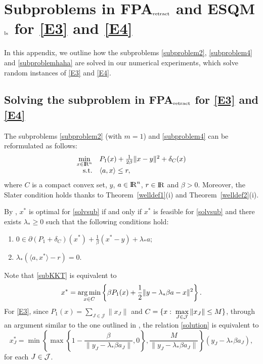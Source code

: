 \documentclass[10pt]{article}
\numberwithin{equation}{section}
\def\R{{\rm I\!R}}
\def\argmin{\mathop{\rm arg\,min}}
\begin{document}
\appendix

\section{Subproblems in FPA$_{\rm retract}$ and ESQM$_{\rm ls}$ for \eqref{E3} and \eqref{E4}}

In this appendix, we outline how the subproblems \eqref{subproblem2}, \eqref{subproblem4} and \eqref{subproblemhaha} are solved in our numerical experiments, which solve random instances of \eqref{E3} and \eqref{E4}.

\subsection{Solving the subproblem in FPA$_{\rm retract}$ for \eqref{E3} and \eqref{E4} }\label{sec:append1}
The subproblems \eqref{subproblem2} (with $m = 1$) and \eqref{subproblem4} can be reformulated as follows:
\begin{equation}\label{solvsub}
  \begin{array}{rl}
\min\limits_{x\in\R^n} & P_1(x) + \frac{1}{2\beta}\|x - y\|^2 + \delta_{C}(x)\\
{\rm s.t.} & \langle a, x\rangle\leq r,
  \end{array}
\end{equation}
where $C$ is a compact convex set, $y$, $a\in\R^n$, $r\in \R$ and $\beta >0$. Moreover, the Slater condition holds thanks to Theorem~\ref{welldef1}(i) and Theorem~\ref{welldef2}(i).

By \cite[Corollary~28.2.1, Theorem~28.3]{Ro70}, $x^*$ is optimal for \eqref{solvsub} if and only if $x^*$ is feasible {\color{black} for \eqref{solvsub}} and there exists $\lambda_*\ge 0$ such that the following conditions hold:
\begin{enumerate}[{\rm (I)}]
  \item\label{subKKT}  $0\in\partial (P_1 + \delta_{C})(x^*) + \frac{1}{\beta}(x^* - y) + \lambda_*a $;
  \item\label{subKKT2}  $\lambda_*(\langle a, x^*\rangle - r)=0$.
\end{enumerate}
Note that \eqref{subKKT} is equivalent to
\begin{equation}\label{solution}
x^* = \argmin_{x\in C}\left\{\beta P_1(x) + \frac12\|y - \lambda_*\beta a - x\|^2\right\}.
\end{equation}
For \eqref{E3}, since $P_1(x) = \sum\limits_{J\in\mathcal{J}}\|x_J\|$ and $C = \{x:\; \max\limits_{J\in {\cal J}}\|x_J\|\leq M\}$, through an argument similar to the one outlined in \cite[Appendix]{LiuPo17}, the relation \eqref{solution} is equivalent to
\begin{equation}\label{solution1}
x^*_J = \min\left\{\max\left\{1 - \frac{\beta}{\|y_J - \lambda_*\beta a_J\|}, 0\right\},\frac{M}{\|y_J - \lambda_*\beta a_J\|}\right\}(y_J - \lambda_*\beta a_J),
\end{equation}
for each $J \in {\cal J}$.
\end{document}

